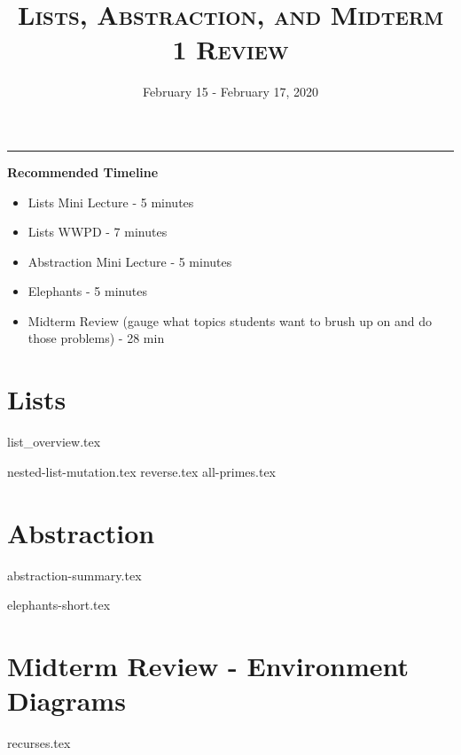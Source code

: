 \documentclass{exam}
\title{\textsc{Lists, Abstraction, and Midterm 1 Review}}
\date{February 15 - February 17, 2020}
\begin{document}
\maketitle
\rule{\textwidth}{0.15em}
\fontsize{12}{15}\selectfont


\begin{guide}
    \textbf{Recommended Timeline}
    \begin{itemize}
        \item Lists Mini Lecture - 5 minutes
        \item Lists WWPD - 7 minutes
        \item Abstraction Mini Lecture - 5 minutes
        \item Elephants - 5 minutes
        \item Midterm Review (gauge what topics students want to brush up on and do those problems) - 28 min
    \end{itemize}
\end{guide}

\section{Lists}
{list_overview.tex}
\begin{questions}
{nested-list-mutation.tex}
{reverse.tex}
{all-primes.tex}
\end{questions}

\newpage
\section{Abstraction}
{abstraction-summary.tex}
\begin{questions}
{elephants-short.tex}
\end{questions}

\newpage
\section{Midterm Review - Environment Diagrams}
\begin{questions}
{recurses.tex}
\end{questions}
\end{document}

